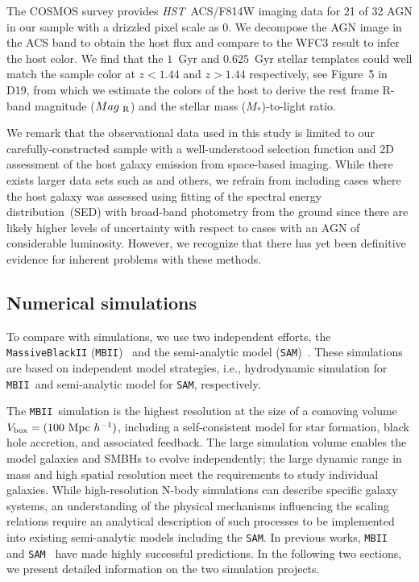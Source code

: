 \documentclass[twocolumn,trackchanges]{aastex63}
\newcommand{\hst}{{\it HST}}
\newcommand{\mr}{$Mag_{\rm ~R}$}
\newcommand{\mstar}{{$M_*$}}
\newcommand{\sam}{\texttt{SAM}}
\newcommand{\mbii}{\texttt{MBII}}
\newcommand{\blue}[1]{{{#1}}}
\newcommand{\pink}[1]{{{#1}}}
\begin{document}
\blue{The COSMOS survey provides \hst\ ACS/F814W imaging data for 21 of 32 AGN in our sample with a drizzled pixel scale as 0\farcs03. We decompose the AGN image in the ACS band to obtain the host flux and compare to the WFC3 result to infer the host color. We find that the $1$~Gyr and $0.625$~Gyr stellar templates could well match the sample color at $z<1.44$ and $z>1.44$ respectively, see Figure~5 in D19, from which we estimate the colors of the host to derive the rest frame R-band magnitude (\mr) and the stellar mass (\mstar)-to-light ratio.}

\pink{We remark that the observational data used in this study is limited to our carefully-constructed sample with a well-understood selection function and 2D assessment of the host galaxy emission from space-based imaging. While there exists larger data sets such as \citet{Sun2015} and others, we refrain from including cases where the host galaxy was assessed using fitting of the spectral energy distribution~(SED) with broad-band photometry from the ground since there are likely higher levels of uncertainty with respect to cases with an AGN of considerable luminosity. However, we recognize that there has yet been definitive evidence for inherent problems with these methods.}

\subsection{Numerical simulations}\label{sample_sim}
To compare with simulations, we use two independent efforts, the \texttt{MassiveBlackII} (\texttt{MBII})~\citep{Khandai2015} and the semi-analytic model (\texttt{SAM})~\citep{Menci2014}. These simulations are based on independent model strategies, i.e., hydrodynamic simulation for \mbii\ and semi-analytic model for \sam, respectively.

The \mbii\ simulation is the highest resolution at the size of a comoving volume $V_{\rm box} = (100~{\rm Mpc}~h^{-1})$, including a self-consistent model for star formation, black hole accretion, and associated feedback. The large simulation volume enables the model galaxies and SMBHs to evolve independently; the large dynamic range in mass and high spatial resolution meet the requirements to study individual galaxies. While high-resolution N-body simulations can describe specific galaxy systems, an understanding of the physical mechanisms influencing the scaling relations require an analytical description of such processes to be implemented into existing semi-analytic models including the \sam. In previous works, \mbii~\citep{Huang2018, DeG++15, Khandai2015,Bhowmick2019} and \sam~\citep{Menci2014, Menci2016} have made highly successful predictions. \blue{In the following two sections, we present detailed information on the two simulation projects.}
\end{document}
